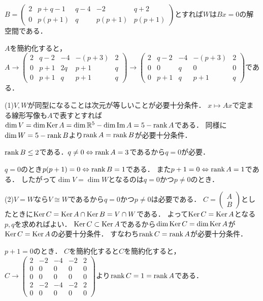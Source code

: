 \documentclass[
		book,
		head_space=20mm,
		foot_space=20mm,
		gutter=10mm,
		line_length=190mm
]{jlreq}
\begin{document}
$B=\begin{pmatrix}
2&p+q-1&q-4&-2&q+2\\
0&p(p+1)&q&p(p+1)&p(p+1)
\end{pmatrix}$とすれば$W$は$Bx=0$の解空間である．

$A$を簡約化すると，$A\rightarrow\begin{pmatrix}
2&q-2&-4&-(p+3)&2\\
0&p+1&2q&p+1&q\\
0&p+1&q&p+1&q
\end{pmatrix}\rightarrow \begin{pmatrix}
2&q-2&-4&-(p+3)&2\\
0&0&q&0&0\\
0&p+1&q&p+1&q
\end{pmatrix}$である．

(1)$V,W$が同型になることは次元が等しいことが必要十分条件．
$x\mapsto Ax$で定まる線形写像も$A$で表すとすれば$\dim V=\dim \mathop{\mathrm{Ker}} A=\dim \mathbb{R}^5-\dim \mathop{\mathrm{Im}} A=5-\rank A$である．
同様に$\dim W=5-\rank B$より$\rank A=\rank B$が必要十分条件．

$\rank B\le 2$である．$q\neq 0\Leftrightarrow \rank A=3$であるから$q=0$が必要．

$q=0$のとき$p(p+1)=0\Leftrightarrow\rank B=1$である．
また$p+1=0 \Leftrightarrow \rank A=1$である．
したがって$\dim V=\dim W$となるのは$q=0$かつ$p\neq 0$のとき．

(2)$V=W$なら$V\cong W$であるから$q=0$かつ$p\neq 0$は必要である．
$C=\begin{pmatrix}
A\\B
\end{pmatrix}$としたときに$\mathop{\mathrm{Ker}} C=\mathop{\mathrm{Ker}} A\cap \mathop{\mathrm{Ker}} B=V\cap W$である．
よって$\mathop{\mathrm{Ker}} C=\mathop{\mathrm{Ker}} A$となる$p,q$を求めればよい．
$\mathop{\mathrm{Ker}} C\subset \mathop{\mathrm{Ker}} A$であるから$\dim \mathop{\mathrm{Ker}} C=\dim \mathop{\mathrm{Ker}} A$が$\mathop{\mathrm{Ker}} C=\mathop{\mathrm{Ker}} A$の必要十分条件．
すなわち$\rank C=\rank A$が必要十分条件．

$p+1=0$のとき．
$C$を簡約化すると$C$を簡約化すると，$C\rightarrow \begin{pmatrix}
2&-2&-4&-2&2\\
0&0&0&0&0\\
0&0&0&0&0\\
2&-2&-4&-2&2\\
0&0&0&0&0
\end{pmatrix}$より$\rank C=1=\rank A$である．
\end{document}
